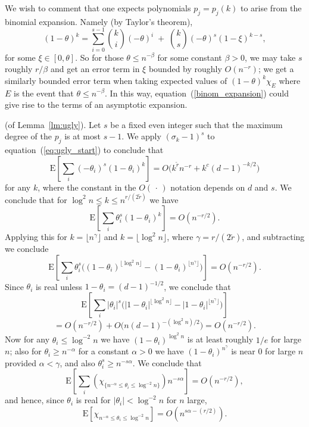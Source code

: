 \documentclass[12pt]{article}
\newcommand{\E}[1]{\mbox{E}\left[#1\right] }
\newcommand{\proof}{{\par\noindent {\bf Proof}\space\space}}
\begin{document}
We wish to comment that one expects polynomials $p_j=p_j(k)$ to arise from
the binomial expansion.  Namely (by Taylor's theorem),
\begin{equation}\label{binom_expansion}
(1-\theta)^k = \sum_{i=0}^{s-1} \binom{k}{i}(-\theta)^i \; + \;
\binom{k}{s}(-\theta)^s(1-\xi)^{k-s},
\end{equation}
for some $\xi\in[0,\theta]$.  So for those $\theta\le n^{-\beta}$ for some
constant $\beta>0$, we may take $s$ roughly $r/\beta$ and get an error term
in $\xi$ bounded by roughly $O(n^{-r})$; we get a similarly bounded error
term when taking expected
values of $(1-\theta)^k\chi_E$ where $E$ is
the event that $\theta\le n^{-\beta}$.
In this way, equation~(\ref{binom_expansion}) could give rise to the terms
of an asymptotic expansion.
\proof (of Lemma~\ref{lm:ugly}).
Let $s$ be a fixed even integer such that
the maximum degree of the $p_j$ is at most $s-1$.  We apply $(\sigma_k-1)^s$ to
equation~(\ref{eq:ugly_start}) to conclude that
$$
\E{ \sum_i (-\theta_i)^s(1-\theta_i)^k } = 
O\bigl(k^{\widetilde r}n^{-r} + k^c (d-1)^{-k/2}\bigr)
$$
for any $k$, where the constant in the $O(\,\cdot\,)$ notation depends
on $d$ and $s$.  We conclude that for $\log^2 n\le k\le n^{r/(2\widetilde r)}$
we have
$$
\E{ \sum_i \theta_i^s(1-\theta_i)^k } = O(n^{-r/2}).
$$
Applying this for $k=\lfloor n^\gamma\rfloor$ and 
$k=\lfloor\log^2 n\rfloor$, where
$\gamma=r/(2\widetilde r)$, and subtracting
we conclude
$$
\E{ \sum_i \theta_i^s \bigl( (1-\theta_i)^{\lfloor\log^2n\rfloor} - (1-\theta_i)^{\lfloor n^\gamma\rfloor}
 \bigr)}
 = O(n^{-r/2}).
$$
Since $\theta_i$ is real unless $1-\theta_i=(d-1)^{-1/2}$, we conclude
that
$$
\E{ \sum_i |\theta_i|^s \bigl( |1-\theta_i|^{\lfloor\log^2n\rfloor} - |1-\theta_i|^{\lfloor n^\gamma\rfloor}
 \bigr)}
$$
$$
 = O(n^{-r/2})+O\bigl( n(d-1)^{-(\log^2 n)/2} \bigr)= O(n^{-r/2}).
$$
Now for any $\theta_i\le \log^{-2}n$ we have $(1-\theta_i)^{\log^2n}$
is at least roughly $1/e$ for large $n$; also for $\theta_i\ge n^{-\alpha}$
for a constant $\alpha>0$ we have $(1-\theta_i)^{n^\gamma}$ is near $0$
for large $n$ provided $\alpha<\gamma$, and also $\theta_i^s\ge n^{-s\alpha}$.
We conclude that
$$
\E{ \sum_i (\chi_{\{n^{-\alpha}\le\theta_i\le\log^{-2}n\}}) n^{-s\alpha} }
=O(n^{-r/2}),
$$
and hence, since $\theta_i$ is real for $|\theta_i|<\log^{-2}n$ for
$n$ large,
\begin{equation}\label{eq:midrange}
\E{ \chi_{n^{-\alpha}\le\theta_i\le\log^{-2}n} } = O(n^{s\alpha-(r/2)}).
\end{equation}
\end{document}
